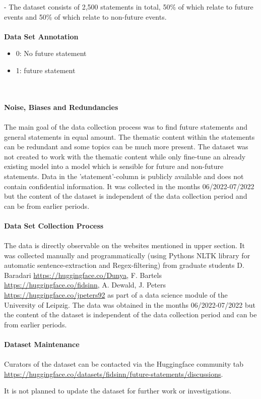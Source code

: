 %
- The dataset consists of 2,500 statements in total, 50\% of which relate to future events and 50\% of which relate to non-future events.
\\
\\
\textbf{Data Set Annotation}
\begin{itemize}
    \item 0: No future statement
    \item 1: future statement
\end{itemize}%
\\
\\
\textbf{Noise, Biases and Redundancies}
\\
\\
The main goal of the data collection process was to find future statements and general statements in equal amount.
The thematic content within the statements can be redundant and some topics can be much more present.
The dataset was not created to work with the thematic content while only fine-tune an already existing model into a model which is sensible for future and non-future statements.
Data in the 'statement'-column is publicly available and does not contain confidential information.
It was collected in the months 06/2022-07/2022 but the content of the dataset is independent of the data collection period and can be from earlier periods.
\\
\\
\textbf{Data Set Collection Process}
\\
\\
The data is directly observable on the websites mentioned in upper section.
It was collected manually and programmatically (using Pythons NLTK library for automatic sentence-extraction and Regex-filtering)
from graduate students D. Baradari \url{https://huggingface.co/Dunya}, F. Bartels \url{https://huggingface.co/fidsinn}, A. Dewald, J. Peters \url{https://huggingface.co/jpeters92} as part of a data science module of the University of Leipzig.
The data was obtained in the months 06/2022-07/2022 but the content of the dataset is independent of the data collection period and can be from earlier periods.
\\
\\
\textbf{Dataset Maintenance}
\\
\\
Curators of the dataset can be contacted via the Huggingface community tab \url{https://huggingface.co/datasets/fidsinn/future-statements/discussions}.

It is not planned to update the dataset for further work or investigations.